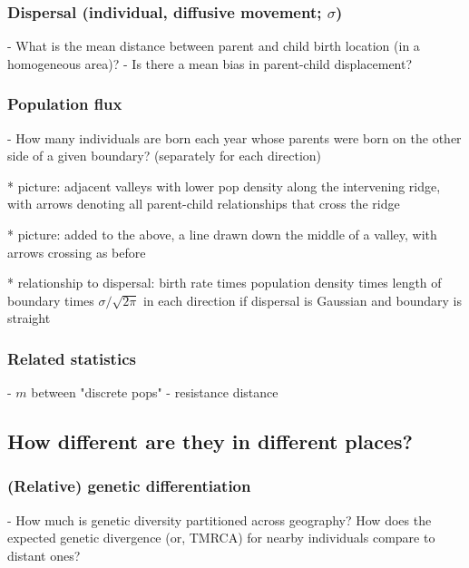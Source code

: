 \documentclass{ar-1col}
\begin{document}
\subsubsection{Dispersal (individual, diffusive movement; $\sigma$)}

        - What is the mean distance between parent and child birth location (in a homogeneous area)?
        - Is there a mean bias in parent-child displacement?

\subsubsection{Population flux}

        - How many individuals are born each year whose parents were born on the other side of a given boundary?
            (separately for each direction)

            * picture: adjacent valleys with lower pop density along the intervening ridge,
                with arrows denoting all parent-child relationships that cross the ridge 

            * picture: added to the above, a line drawn down the middle of a valley, with arrows crossing as before

            * relationship to dispersal: birth rate times population density times length of boundary times $\sigma/\sqrt{2\pi}$ in each direction 
                if dispersal is Gaussian and boundary is straight

\subsubsection{Related statistics}

        - $m$ between "discrete pops"
        - resistance distance


\subsection{How different are they in different places?}

\subsubsection{(Relative) genetic differentiation}

        - How much is genetic diversity partitioned across geography?
            How does the expected genetic divergence (or, TMRCA) for nearby individuals compare to distant ones?
            
\end{document}

